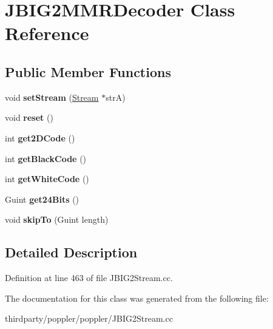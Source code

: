 \hypertarget{class_j_b_i_g2_m_m_r_decoder}{}\section{J\+B\+I\+G2\+M\+M\+R\+Decoder Class Reference}
\label{class_j_b_i_g2_m_m_r_decoder}
\subsection*{Public Member Functions}
\begin{DoxyCompactItemize}
\item 
\mbox{\label{class_j_b_i_g2_m_m_r_decoder_affc581b196fcc1ae7244f2c207640f23}} 
void {\bfseries set\+Stream} (\hyperlink{class_stream}{Stream} $\ast$strA)
\item 
\mbox{\label{class_j_b_i_g2_m_m_r_decoder_a3493d8fa143ad7ef30a26851b5c6daf4}} 
void {\bfseries reset} ()
\item 
\mbox{\label{class_j_b_i_g2_m_m_r_decoder_a34fe49deff0d733c0dff6eb258de1879}} 
int {\bfseries get2\+D\+Code} ()
\item 
\mbox{\label{class_j_b_i_g2_m_m_r_decoder_a2b4310fc767d9c92685c4328437826de}} 
int {\bfseries get\+Black\+Code} ()
\item 
\mbox{\label{class_j_b_i_g2_m_m_r_decoder_a92eb55a4dcd58f74e91ba655cb579679}} 
int {\bfseries get\+White\+Code} ()
\item 
\mbox{\label{class_j_b_i_g2_m_m_r_decoder_affce18a7727c74c6b4b5c55514904bf2}} 
Guint {\bfseries get24\+Bits} ()
\item 
\mbox{\label{class_j_b_i_g2_m_m_r_decoder_a42d42e2e75d3ce0dcffda435762e5277}} 
void {\bfseries skip\+To} (Guint length)
\end{DoxyCompactItemize}


\subsection{Detailed Description}


Definition at line 463 of file J\+B\+I\+G2\+Stream.\+cc.



The documentation for this class was generated from the following file\+:\begin{DoxyCompactItemize}
\item 
thirdparty/poppler/poppler/J\+B\+I\+G2\+Stream.\+cc\end{DoxyCompactItemize}
